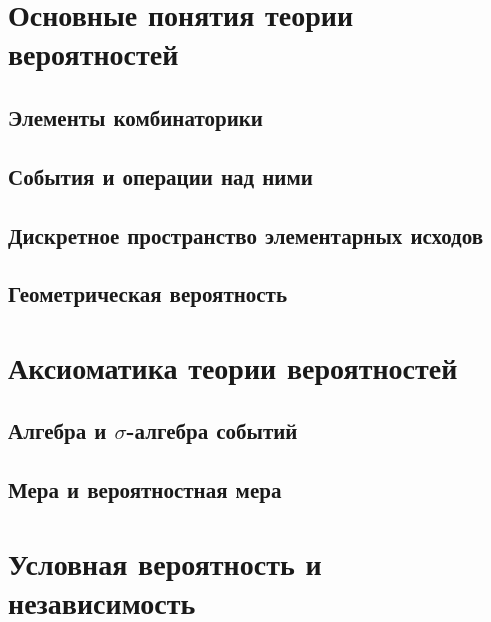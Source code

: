 \section{Основные понятия теории вероятностей}

\subsection{Элементы комбинаторики}


\subsection{События и операции над ними}


\subsection{Дискретное пространство элементарных исходов}


% 

\subsection{Геометрическая вероятность}





\section{Аксиоматика теории вероятностей}

\subsection{Алгебра и \texorpdfstring{$\sigma$}{сигма}-алгебра событий}


\subsection{Мера и вероятностная мера}





\section{Условная вероятность и независимость}

